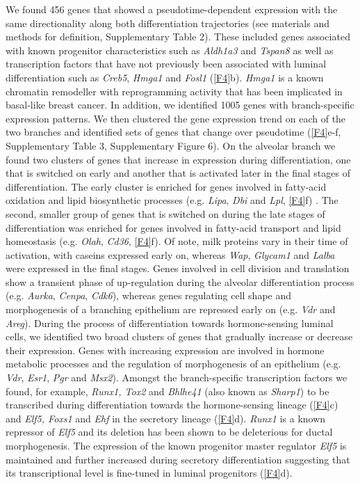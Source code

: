 \documentclass[titlepage, 12pt, oneside]{amsart}
\begin{document}
We found 456 genes that showed a pseudotime-dependent expression with the same directionality along both differentiation trajectories (see materials and methods for definition, Supplementary Table 2).
These included genes associated with known progenitor characteristics such as \textit{Aldh1a3} and \textit{Tspan8} as well as transcription factors that have not previously been associated with luminal differentiation such as \textit{Creb5}, \textit{Hmga1} and \textit{Fosl1} (\autoref{F4}b).
\textit{Hmga1} is a known chromatin remodeller with reprogramming activity that has been implicated in basal-like breast cancer\autocite{Shah2012,Shah2013}.
In addition, we identified 1005 genes with branch-specific expression patterns.
We then clustered the gene expression trend on each of the two branches and identified sets of genes that change over pseudotime (\autoref{F4}e-f, Supplementary Table 3, Supplementary Figure 6).
On the alveolar branch we found two clusters of genes that increase in expression during differentiation, one that is switched on early and another that is activated later in the final stages of differentiation.
The early cluster is enriched for genes involved in fatty-acid oxidation and lipid biosynthetic processes (e.g. \textit{Lipa}, \textit{Dbi} and \textit{Lpl}, \autoref{F4}f) .
The second, smaller group of genes that is switched on during the late stages of differentiation was enriched for genes involved in fatty-acid transport and lipid homeostasis (e.g. \textit{Olah}, \textit{Cd36}, \autoref{F4}f).
Of note, milk proteins vary in their time of activation, with caseins expressed early on, whereas \textit{Wap}, \textit{Glycam1} and \textit{Lalba} were expressed in the final stages.
Genes involved in cell division and translation show a transient phase of up-regulation during the alveolar differentiation process (e.g. \textit{Aurka}, \textit{Cenpa}, \textit{Cdk6}), whereas genes regulating cell shape and morphogenesis of a branching epithelium are repressed early on (e.g. \textit{Vdr} and \textit{Areg}).
During the process of differentiation towards hormone-sensing luminal cells, we identified two broad clusters of genes that gradually increase or decrease their expression.
Genes with increasing expression are involved in hormone metabolic processes and the regulation of morphogenesis of an epithelium (e.g. \textit{Vdr}, \textit{Esr1}, \textit{Pgr} and \textit{Msx2}).
Amongst the branch-specific transcription factors we found, for example, \textit{Runx1, Tox2} and \textit{Bhlhe41} (also known as \textit{Sharp1}) to be transcribed during differentiation towards the hormone-sensing lineage (\autoref{F4}c) and \textit{Elf5, Foxs1} and \textit{Ehf} in the secretory lineage (\autoref{F4}d).
\textit{Runx1} is a known repressor of \textit{Elf5} and its deletion has been shown to be deleterious for ductal morphogenesis\autocite{VanBragt2014}.
The expression of the known progenitor master regulator \textit{Elf5} is maintained and further increased during secretory differentiation suggesting that its transcriptional level is fine-tuned in luminal progenitors (\autoref{F4}d).
\end{document}
